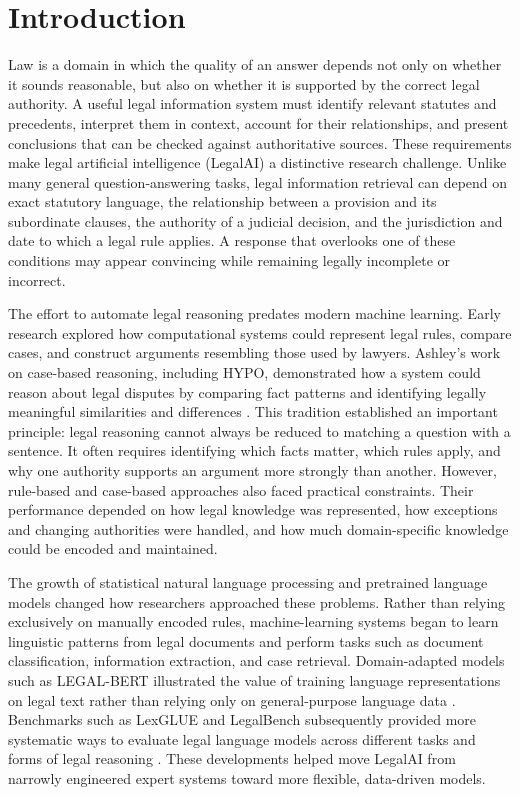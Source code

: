 \section{Introduction}
\label{sec:intro}

Law is a domain in which the quality of an answer depends not only on whether it sounds
reasonable, but also on whether it is supported by the correct legal authority. A useful legal
information system must identify relevant statutes and precedents, interpret them in context,
account for their relationships, and present conclusions that can be checked against
authoritative sources. These requirements make legal artificial intelligence (LegalAI) a
distinctive research challenge. Unlike many general question-answering tasks, legal information
retrieval can depend on exact statutory language, the relationship between a provision and its
subordinate clauses, the authority of a judicial decision, and the jurisdiction and date to
which a legal rule applies. A response that overlooks one of these conditions may appear
convincing while remaining legally incomplete or incorrect.

The effort to automate legal reasoning predates modern machine learning. Early research explored
how computational systems could represent legal rules, compare cases, and construct arguments
resembling those used by lawyers. Ashley's work on case-based reasoning, including HYPO,
demonstrated how a system could reason about legal disputes by comparing fact patterns and
identifying legally meaningful similarities and differences \citep{ashley1991}. This tradition
established an important principle: legal reasoning cannot always be reduced to matching a
question with a sentence. It often requires identifying which facts matter, which rules apply,
and why one authority supports an argument more strongly than another. However, rule-based and
case-based approaches also faced practical constraints. Their performance depended on how legal
knowledge was represented, how exceptions and changing authorities were handled, and how much
domain-specific knowledge could be encoded and maintained.

The growth of statistical natural language processing and pretrained language models changed how
researchers approached these problems. Rather than relying exclusively on manually encoded rules,
machine-learning systems began to learn linguistic patterns from legal documents and perform
tasks such as document classification, information extraction, and case retrieval. Domain-adapted
models such as LEGAL-BERT illustrated the value of training language representations on legal text
rather than relying only on general-purpose language data \citep{chalkidis2020}. Benchmarks such
as LexGLUE and LegalBench subsequently provided more systematic ways to evaluate legal language
models across different tasks and forms of legal reasoning \citep{chalkidis2022, guha2023}. These
developments helped move LegalAI from narrowly engineered expert systems toward more flexible,
data-driven models.

